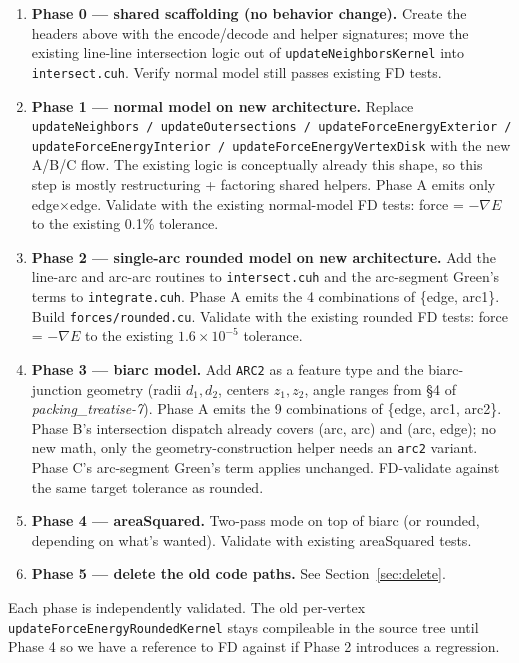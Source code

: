 \documentclass[11pt]{article}
\newcommand{\code}[1]{\texttt{#1}}
\begin{document}
\begin{enumerate}[leftmargin=*]
  \item \textbf{Phase 0 --- shared scaffolding (no behavior change).}
        Create the headers above with the encode/decode and helper
        signatures; move the existing line-line intersection logic out
        of \code{updateNeighborsKernel} into \code{intersect.cuh}. Verify
        normal model still passes existing FD tests.
  \item \textbf{Phase 1 --- normal model on new architecture.}
        Replace \code{updateNeighbors / updateOutersections /
        updateForceEnergyExterior / updateForceEnergyInterior /
        updateForceEnergyVertexDisk} with the new A/B/C flow. The
        existing logic is conceptually already this shape, so this
        step is mostly restructuring + factoring shared helpers.
        Phase A emits only edge$\times$edge.
        Validate with the existing normal-model FD tests: force =
        $-\nabla E$ to the existing 0.1\% tolerance.
  \item \textbf{Phase 2 --- single-arc rounded model on new
        architecture.} Add the line-arc and arc-arc routines to
        \code{intersect.cuh} and the arc-segment Green's terms to
        \code{integrate.cuh}. Phase A emits the 4 combinations of
        \{edge, arc1\}. Build \code{forces/rounded.cu}. Validate with
        the existing rounded FD tests: force = $-\nabla E$ to the
        existing $1.6 \times 10^{-5}$ tolerance.
  \item \textbf{Phase 3 --- biarc model.} Add \code{ARC2} as a feature
        type and the biarc-junction geometry (radii $d_1, d_2$,
        centers $z_1, z_2$, angle ranges from \S 4 of
        \emph{packing\_treatise-7}). Phase A emits the 9 combinations
        of \{edge, arc1, arc2\}. Phase B's intersection dispatch
        already covers (arc, arc) and (arc, edge); no new math, only
        the geometry-construction helper needs an \code{arc2} variant.
        Phase C's arc-segment Green's term applies unchanged.
        FD-validate against the same target tolerance as rounded.
  \item \textbf{Phase 4 --- areaSquared.} Two-pass mode on top of
        biarc (or rounded, depending on what's wanted). Validate
        with existing areaSquared tests.
  \item \textbf{Phase 5 --- delete the old code paths.} See
        Section~\ref{sec:delete}.
\end{enumerate}

Each phase is independently validated. The old per-vertex
\code{updateForceEnergyRoundedKernel} stays compileable in the source
tree until Phase 4 so we have a reference to FD against if Phase 2
introduces a regression.
\end{document}
